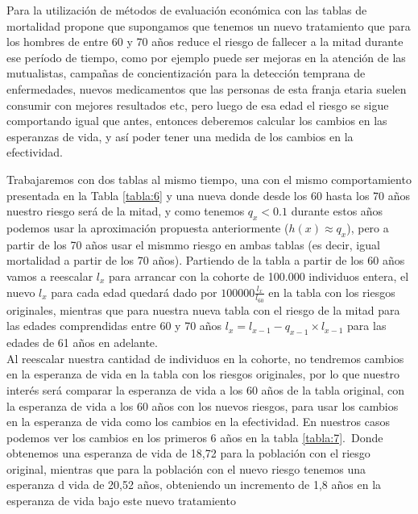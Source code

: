 \documentclass[12pt]{article}
\begin{document}
Para la utilización de métodos de evaluación económica con las tablas de mortalidad \cite{gray_applied_2011} propone que supongamos que tenemos un nuevo tratamiento que para  los hombres de entre 60 y 70 años reduce el riesgo de fallecer a la mitad durante ese período de tiempo, como por ejemplo puede ser mejoras en la atención de las mutualistas, campañas de concientización para la detección temprana de enfermedades, nuevos medicamentos que las personas de esta franja etaria suelen consumir con mejores resultados etc, pero luego de esa edad el riesgo se sigue comportando igual que antes, entonces deberemos calcular los cambios en las esperanzas de vida, y así poder tener una medida de los cambios en la efectividad.\

Trabajaremos con dos tablas al mismo tiempo, una con el mismo comportamiento presentada en la Tabla \ref{tabla:6} y una nueva donde desde los 60 hasta los 70 años nuestro riesgo será de la mitad, y como tenemos $q_x<0.1$ durante estos años podemos usar la aproximación propuesta anteriormente ($h(x) \approx q_x$), pero a partir de los 70 años usar el mismmo riesgo en ambas tablas (es decir, igual mortalidad a partir de los 70 años).
Partiendo de la tabla a partir de los 60 años vamos a reescalar $l_x$ para arrancar con la cohorte de 100.000 individuos entera, el nuevo $l_x$ para cada edad quedará dado por $100000\frac{l_x}{l_{60}}$ en la tabla con los riesgos originales, mientras que para nuestra nueva tabla con el riesgo de la mitad para las edades comprendidas entre 60 y 70 años $l_x=l_{x-1}-q_{x-1}\times l_{x-1}$ para las edades de 61 años en adelante.\\

Al reescalar nuestra cantidad de individuos en la cohorte, no tendremos cambios en la esperanza de vida en la tabla con los riesgos originales, por lo que nuestro interés será comparar la esperanza de vida a los 60 años de la tabla original, con la esperanza de vida a los 60 años con los nuevos riesgos, para usar los cambios en la esperanza de vida como los cambios en la efectividad. En nuestros casos podemos ver los cambios en los primeros 6 años en la tabla \ref{tabla:7}.\
Donde obtenemos una esperanza de vida de 18,72 para la población con el riesgo original, mientras que para la población con el nuevo riesgo tenemos una esperanza d vida de 20,52 años, obteniendo un incremento de 1,8 años en la esperanza de vida bajo este nuevo tratamiento\\
\end{document}
